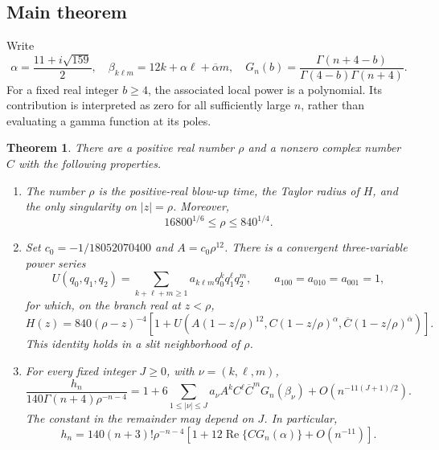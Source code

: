 \documentclass[11pt]{article}
\newtheorem{theorem}{Theorem}[section]
\theoremstyle{remark}\newtheorem{remark}[theorem]{Remark}
\DeclareMathOperator{\Rea}{Re}
\newcommand{\ba}{\overline\alpha}
\newcommand{\bC}{\overline C}
\numberwithin{equation}{section}
\begin{document}
\subsection{Main theorem}
Write
\begin{equation}\label{his:o7:alpha}
\alpha=\frac{11+i\sqrt{159}}2,\quad
\beta_{k\ell m}=12k+\alpha\ell+\ba m,\quad
G_n(b)=\frac{\Gamma(n+4-b)}{\Gamma(4-b)\Gamma(n+4)}.
\end{equation}
For a fixed real integer $b\ge4$, the associated local power is a
polynomial. Its contribution is interpreted as zero for all sufficiently
large $n$, rather than evaluating a gamma function at its poles.

\begin{theorem}\label{his:o7:main}
There are a positive real number $\rho$ and a nonzero complex number $C$
with the following properties.
\begin{enumerate}[label=(\roman*)]
\item The number $\rho$ is the positive-real blow-up time, the Taylor
radius of $H$, and the only singularity on $|z|=\rho$. Moreover,
\begin{equation}\label{his:o7:bounds}
16800^{1/6}\le\rho\le840^{1/4}.
\end{equation}
\item Set $c_0=-1/18052070400$ and $A=c_0\rho^{12}$.
There is a convergent three-variable power series
\[
U(q_0,q_1,q_2)=\sum_{k+\ell+m\ge1}a_{k\ell m}q_0^kq_1^\ell q_2^m,
\qquad a_{100}=a_{010}=a_{001}=1,
\]
for which, on the branch real at $z<\rho$,
\begin{equation}\label{his:o7:local-main}
H(z)=840(\rho-z)^{-4}
\left[1+U\left(A(1-z/\rho)^{12},
C(1-z/\rho)^\alpha,\bC(1-z/\rho)^{\ba}\right)\right].
\end{equation}
This identity holds in a slit neighborhood of $\rho$.
\item For every fixed integer $J\ge0$, with $\nu=(k,\ell,m)$,
\begin{equation}\label{his:o7:allsectors}
\frac{h_n}{140\Gamma(n+4)\rho^{-n-4}}
=1+6\!\sum_{1\le|\nu|\le J}
 a_\nu A^k C^\ell\bC^{m}G_n(\beta_\nu)
 +O\!\left(n^{-11(J+1)/2}\right).
\end{equation}
The constant in the remainder may depend on $J$. In particular,
\begin{equation}\label{his:o7:first}
h_n=140(n+3)!\rho^{-n-4}
\left[1+12\Rea\{C G_n(\alpha)\}+O(n^{-11})\right].
\end{equation}
\end{enumerate}
\end{theorem}
\end{document}

